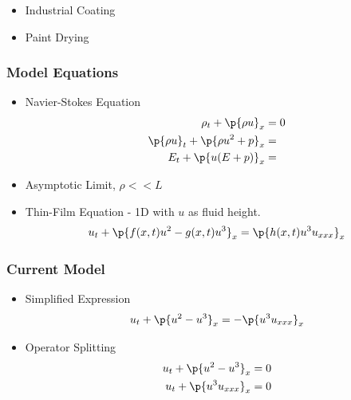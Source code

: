 \documentclass[10pt]{beamer}
\begin{document}
\begin{frame}
\begin{center}
      \end{center}
      \begin{itemize}
        \item Industrial Coating
        \item Paint Drying
      \end{itemize}
    \end{frame}

    \begin{frame}
      \frametitle{Model Equations}
      \begin{itemize}
        \item Navier-Stokes Equation
          \begin{align*}
            \rho_t + \p{\rho u}_x &= 0 \\
            \p{\rho u}_t + \p{\rho u^2 + p}_x &=  \\
            E_t + \p{u (E + p)}_x &=
          \end{align*}
        \item Asymptotic Limit, $\rho << L$
        \item Thin-Film Equation - 1D with $u$ as fluid height.
          \[
            u_t + \p{f(x, t) u^2 - g(x, t) u^3}_x = \p{h(x, t) u^3 u_{xxx}}_x
          \]
      \end{itemize}
    \end{frame}

    \begin{frame}
      \frametitle{Current Model}
      \begin{itemize}
        \item Simplified Expression
          \[
            u_t + \p{u^2 - u^3}_x = -\p{u^3 u_{xxx}}_x
          \]

        \item Operator Splitting
          \begin{align*}
            u_t + \p{u^2 - u^3}_x &= 0 \\
            u_t + \p{u^3 u_{xxx}}_x &= 0
          \end{align*}
      \end{itemize}
    \end{frame}
\end{document}
